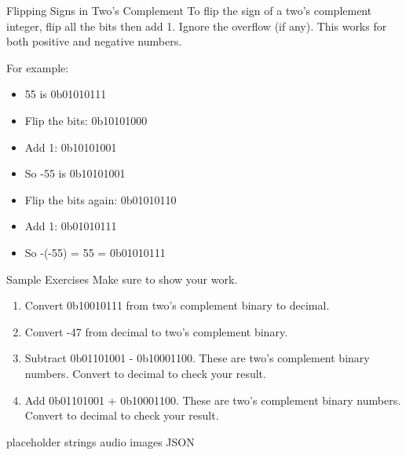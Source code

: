 \begin{frame}{Flipping Signs in Two's Complement}
    To flip the sign of a two's complement integer, flip all the bits then add 1. Ignore the overflow (if any). This works for both positive and negative numbers.

    For example:
    \begin{itemize}
        \item 55 is 0b01010111
        \item Flip the bits: 0b10101000
        \item Add 1: 0b10101001
        \item So -55 is 0b10101001
        \item Flip the bits again: 0b01010110
        \item Add 1: 0b01010111
        \item So -(-55) = 55 = 0b01010111
    \end{itemize}
\end{frame}

\begin{frame}{Sample Exercises}
    Make sure to show your work.
    \begin{enumerate}
        \item Convert 0b10010111 from two's complement binary to decimal.
        \item Convert -47 from decimal to two's complement binary.
        \item Subtract 0b01101001 - 0b10001100. These are two's complement binary numbers.
              Convert to decimal to check your result.
        \item Add 0b01101001 + 0b10001100. These are two's complement binary numbers. Convert
              to decimal to check your result.
    \end{enumerate}
\end{frame}




\begin{frame}{placeholder}
    strings
    audio
    images
    JSON
\end{frame}

